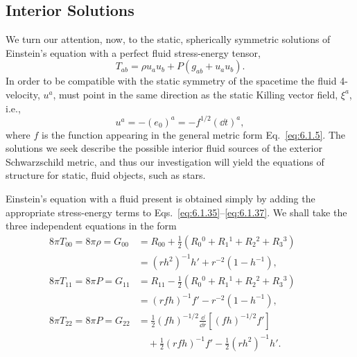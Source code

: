 
\subsection{Interior Solutions}\label{sec:6.2}

We turn our attention, now, to the static, spherically symmetric solutions of
Einstein's equation with a perfect fluid stress-energy tensor,
\begin{equation}
  T_{ab}=\rho u_a u_b+P(g_{ab}+u_a u_b).
  \tag{6.2.1}\label{eq:6.2.1}
\end{equation}
In order to be compatible with the static symmetry of the spacetime the fluid
4-velocity, \(u^a\), must point in the same direction as the static Killing vector
field, \(\xi^a\), i.e.,
\begin{equation}
  u^a=-(e_0)^a=-f^{1/2}(\dd t)^a,
  \tag{6.2.2}\label{eq:6.2.2}
\end{equation}
where \(f\) is the function appearing in the general metric form
Eq.~\eqref{eq:6.1.5}. The solutions we seek describe the possible interior fluid
sources of the exterior Schwarzschild metric, and thus our investigation will
yield the equations of structure for static, fluid objects, such as stars.

Einstein's equation with a fluid present is obtained simply by adding the
appropriate stress-energy terms to Eqs.~\eqref{eq:6.1.35}--\eqref{eq:6.1.37}. We
shall take the three independent equations in the form
\begin{align}
  8\pi T_{00}=8\pi\rho=G_{00}
    &=R_{00}+\frac12(R_0{}^0+R_1{}^1+R_2{}^2+R_3{}^3)\nonumber\\
    &=(rh^2)^{-1}h'+r^{-2}(1-h^{-1}),
  &&\tag{6.2.3}\label{eq:6.2.3}\\
  8\pi T_{11}=8\pi P=G_{11}
    &=R_{11}-\frac12(R_0{}^0+R_1{}^1+R_2{}^2+R_3{}^3)\nonumber\\
    &=(rfh)^{-1}f'-r^{-2}(1-h^{-1}),
  &&\tag{6.2.4}\label{eq:6.2.4}\\
  8\pi T_{22}=8\pi P=G_{22}
    &=\frac12(fh)^{-1/2}\frac{\dd}{\dd r}\left[(fh)^{-1/2}f'\right]\nonumber\\
    &\quad+\frac12(rfh)^{-1}f'-\frac12(rh^2)^{-1}h'.
  &&\tag{6.2.5}\label{eq:6.2.5}
\end{align}

